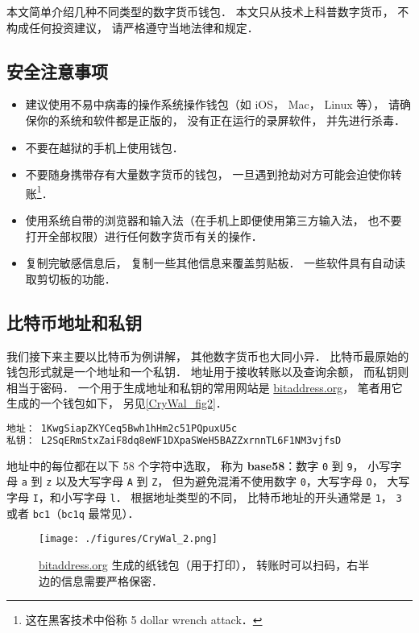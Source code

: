 
本文简单介绍几种不同类型的数字货币钱包． 本文只从技术上科普数字货币， 不构成任何投资建议， 请严格遵守当地法律和规定．

\subsection{安全注意事项}
\begin{itemize}
\item 建议使用不易中病毒的操作系统操作钱包（如 iOS， Mac， Linux 等）， 请确保你的系统和软件都是正版的， 没有正在运行的录屏软件， 并先进行杀毒．
\item 不要在越狱的手机上使用钱包．
\item 不要随身携带存有大量数字货币的钱包， 一旦遇到抢劫对方可能会迫使你转账\footnote{这在黑客技术中俗称 5 dollar wrench attack．}．
\item 使用系统自带的浏览器和输入法（在手机上即便使用第三方输入法， 也不要打开全部权限）进行任何数字货币有关的操作．
\item 复制完敏感信息后， 复制一些其他信息来覆盖剪贴板． 一些软件具有自动读取剪切板的功能．
\end{itemize}

\subsection{比特币地址和私钥}
我们接下来主要以比特币为例讲解， 其他数字货币也大同小异． 比特币最原始的钱包形式就是一个地址和一个私钥． 地址用于接收转账以及查询余额， 而私钥则相当于密码． 一个用于生成地址和私钥的常用网站是 \href{https://www.bitaddress.org/}{bitaddress.org}， 笔者用它生成的一个钱包如下， 另见\autoref{CryWal_fig2}．
\begin{lstlisting}[language=bash]
地址： 1KwgSiapZKYCeq5Bwh1hHm2c51PQpuxU5c
私钥： L2SqERmStxZaiF8dq8eWF1DXpaSWeH5BAZZxrnnTL6F1NM3vjfsD
\end{lstlisting}

地址中的每位都在以下 58 个字符中选取， 称为 \textbf{base58}：数字 \verb|0| 到 \verb|9|， 小写字母 \verb|a| 到 \verb|z| 以及大写字母 \verb|A| 到 \verb|Z|， 但为避免混淆不使用数字 \verb|0|，大写字母 \verb|O|， 大写字母 \verb|I|，和小写字母 \verb|l|． 根据地址类型的不同， 比特币地址的开头通常是 \verb|1|， \verb|3| 或者 \verb|bc1|（\verb|bc1q| 最常见）．

\begin{figure}[ht]
\centering
\texttt{[image: ./figures/CryWal\_2.png]}
\caption{\href{https://www.bitaddress.org/}{bitaddress.org} 生成的纸钱包（用于打印）， 转账时可以扫码，右半边的信息需要严格保密．} \label{CryWal_fig2}
\end{figure}

